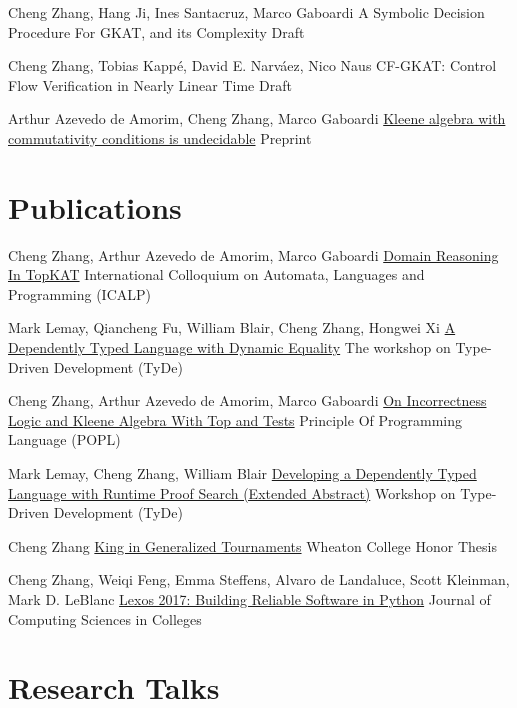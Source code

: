 \documentclass[11pt,roman]{moderncv}        %
\begin{document}
{Cheng Zhang, Hang Ji, Ines Santacruz, Marco Gaboardi}
{A Symbolic Decision Procedure For GKAT, and its Complexity}
{Draft}
{}{}

{Cheng Zhang, Tobias Kappé, David E. Narváez, Nico Naus}
{CF-GKAT: Control Flow Verification in Nearly Linear Time}
{Draft}
{}{}

{Arthur Azevedo de Amorim, Cheng Zhang, Marco Gaboardi}
{\href{https://hal.science/hal-04534715/}{Kleene algebra with commutativity conditions is undecidable}}
{Preprint}
{}{}

\section{Publications}

{Cheng Zhang, Arthur Azevedo de Amorim, Marco Gaboardi}
{\href{https://arxiv.org/abs/2404.18417}{Domain Reasoning In TopKAT}}
{International Colloquium on Automata, Languages and Programming (ICALP)}
{}{}

{Mark Lemay, Qiancheng Fu, William Blair, Cheng Zhang, Hongwei Xi}
{\href{https://doi.org/10.1145/3609027.3609407}{A Dependently Typed Language with Dynamic Equality}}
{The workshop on Type-Driven Development (TyDe)}
{}{}

{Cheng Zhang, Arthur Azevedo de Amorim, Marco Gaboardi}
{\href{https://arxiv.org/abs/2108.07707}{On Incorrectness Logic and Kleene Algebra With Top and Tests}}
{Principle Of Programming Language (POPL)}
{}{}

{Mark Lemay, Cheng Zhang, William Blair}
{\href{https://icfp20.sigplan.org/details/tyde-2020-papers/7/Developing-a-Dependently-Typed-Language-with-Runtime-Proof-Search-Extended-Abstract-}
{Developing a Dependently Typed Language with Runtime Proof Search (Extended Abstract)}}
{Workshop on Type-Driven Development (TyDe)}
{}{}

{Cheng Zhang}
{\href{http://hdl.handle.net/11040/24570}{King in Generalized Tournaments}}
{Wheaton College Honor Thesis}
{}{}

{Cheng Zhang, Weiqi Feng, Emma Steffens, Alvaro de Landaluce, Scott Kleinman, Mark D. LeBlanc}
{\href{https://dl.acm.org/doi/10.5555/3205191.3205205}{Lexos 2017: Building Reliable Software in Python}}
{Journal of Computing Sciences in Colleges}
{}{}


\section{Research Talks}
\end{document}
